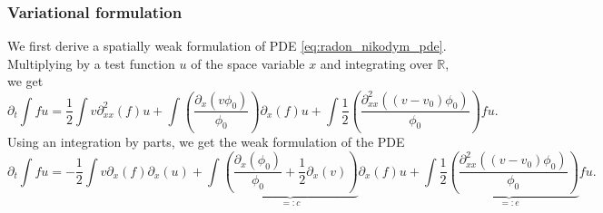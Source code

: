 \documentclass[a4paper]{article}
\newcommand{\1}{\textbf{1}}
\newcommand{\R}{\mathbb{R}}
\begin{document}
\subsubsection*{Variational formulation}
\par We first derive a spatially weak formulation of PDE \eqref{eq:radon_nikodym_pde}. Multiplying by a test function $u$ of the space variable $x$ and integrating over $\R$, we get
$$
\partial_t \int f u = \frac{1}{2} \int v \partial^2_{xx} (f) u + \int \left( \frac{\partial_x(v \phi_0)}{\phi_0}\right) \partial_x (f) u + \int \frac{1}{2} \left(\frac{\partial_{xx}^2((v - v_0)\phi_0)}{\phi_0}\right) f u.
$$
Using an integration by parts, we get the weak formulation of the PDE \begin{equation}\label{eq:weak_formulation}
\partial_t \int f u = -\frac{1}{2} \int v \partial_x (f) \partial_x (u) + \int \underbrace{\left( \frac{\partial_x( \phi_0)}{\phi_0} + \frac{1}{2} \partial_x (v) \right)}_{=: c} \partial_x (f) u + \int \underbrace{\frac{1}{2} \left(\frac{\partial_{xx}^2((v - v_0)\phi_0)}{\phi_0}\right)}_{=: e} f u.
\end{equation}
\end{document}
